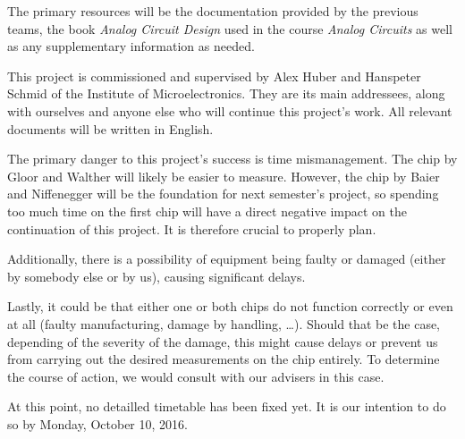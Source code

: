\documentclass[a4paper,10pt]{article}
\begin{document}
The  primary resources  will be  the  documentation provided  by the  previous
teams, the book  \emph{Analog Circuit Design} used in  the course \emph{Analog
Circuits} as well as any supplementary information as needed.

This project is commissioned and supervised by Alex Huber and Hanspeter Schmid
of the Institute of Microelectronics. They are its main addressees, along with
ourselves and anyone else who will continue this project's work.  All relevant
documents will be written in English.

The primary danger  to this project's success is  time mismanagement. The chip
by Gloor  and Walther will likely  be easier to measure. However,  the chip by
Baier and Niffenegger  will be the foundation for next  semester's project, so
spending too much time on the first chip will have a direct negative impact on
the continuation of this project.  It is therefore crucial to properly plan.

Additionally,  there is  a possibility  of equipment  being faulty  or damaged
(either by somebody else or by us), causing significant delays.

Lastly, it could be that either one or both chips do not function correctly or
even at all (faulty manufacturing, damage by handling, \ldots). Should that be
the case, depending of the severity of  the damage, this might cause delays or
prevent us from carrying out the desired measurements on the chip entirely. To
determine the  course of action,  we would consult  with our advisers  in this
case.

At this point, no detailled timetable  has been fixed yet. It is our intention
to do so by Monday, October 10, 2016.
\end{document}

